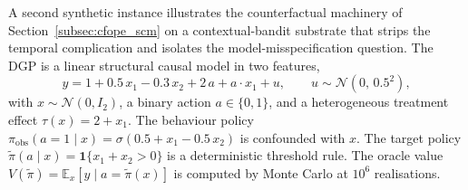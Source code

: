 A second synthetic instance illustrates the counterfactual machinery of Section~\ref{subsec:cfope_scm} on a contextual-bandit substrate that strips the temporal complication and isolates the model-misspecification question. The DGP is a linear structural causal model in two features,
\begin{equation}
y = 1 + 0.5\, x_1 - 0.3\, x_2 + 2\, a + a \cdot x_1 + u,
\qquad u \sim \mathcal N(0,\, 0.5^2),
\label{eq:cfope_dgp}
\end{equation}
with $x \sim \mathcal N(0, I_2)$, a binary action $a \in \{0, 1\}$, and a heterogeneous treatment effect $\tau(x) = 2 + x_1$. The behaviour policy $\pi_{\mathrm{obs}}(a = 1 \mid x) = \sigma(0.5 + x_1 - 0.5\, x_2)$ is confounded with $x$. The target policy $\widetilde\pi(a \mid x) = \mathbf 1\{x_1 + x_2 > 0\}$ is a deterministic threshold rule. The oracle value $V(\widetilde\pi) = \mathbb E_x[y \mid a = \widetilde\pi(x)]$ is computed by Monte Carlo at $10^6$ realisations.

